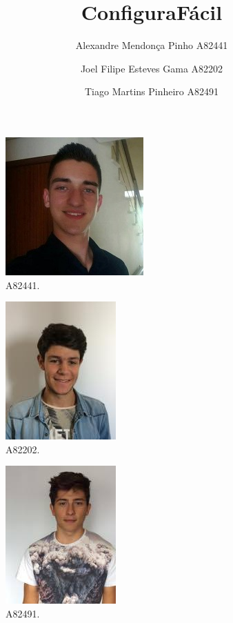 \documentclass{llncs}
\begin{document}
\mainmatter

\title{ConfiguraFácil}


\author{Alexandre Mendonça Pinho A82441\and Joel Filipe Esteves Gama A82202 \and Tiago Martins Pinheiro A82491}


\maketitle

\begin{figure}
  \includegraphics[scale=0.5]{a82441.jpg}
  \caption{A82441.}
  \label{fig:a82441}
\end{figure}

\begin{figure}
  \includegraphics[scale=0.5]{a82202.jpg}
  \caption{A82202.}
  \label{fig:a82202}
\end{figure}

\begin{figure}
  \includegraphics[scale=0.5]{a82491.jpg}
  \caption{A82491.}
  \label{fig:a82491}
\end{figure}
\end{document}
